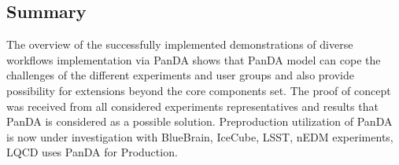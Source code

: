 \subsection{Summary}
\label{subsec:summary}

The overview of the successfully implemented demonstrations of diverse
workflows implementation via PanDA shows that PanDA model can cope the
challenges of the different experiments and user groups and also provide
possibility for extensions beyond the core components set.  The proof of
concept was received from all considered experiments representatives and
results that PanDA is considered as a possible solution. Preproduction
utilization of PanDA is now under investigation with BlueBrain, IceCube, LSST,
nEDM experiments, LQCD uses PanDA for Production.

